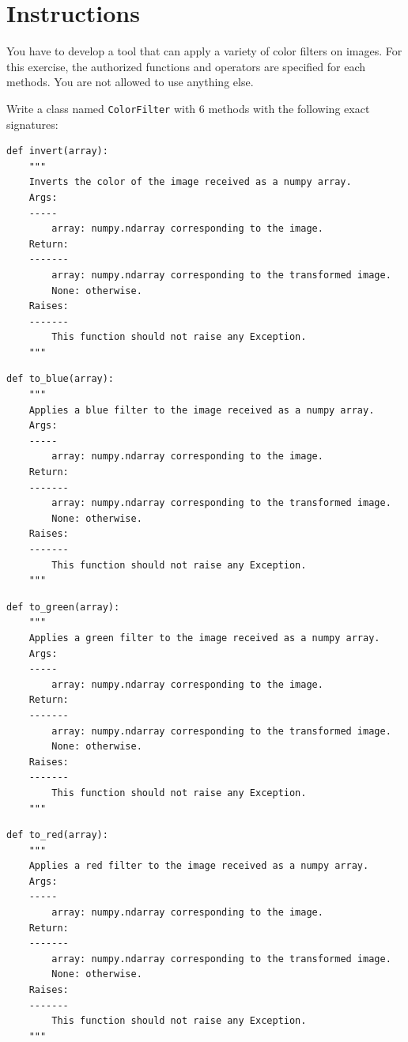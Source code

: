 \documentclass{42-en}
\begin{document}
\section*{Instructions}
You have to develop a tool that can apply a variety of color filters on images.
For this exercise, the authorized functions and operators are specified for each methods.
You are not allowed to use anything else.

Write a class named \texttt{ColorFilter} with 6 methods with the following exact signatures:

\begin{verbatim}
def invert(array):
    """
    Inverts the color of the image received as a numpy array.
    Args:
    -----
        array: numpy.ndarray corresponding to the image.
    Return:
    -------
        array: numpy.ndarray corresponding to the transformed image.
        None: otherwise.
    Raises:
    -------
        This function should not raise any Exception.
    """
\end{verbatim}
\begin{verbatim}
def to_blue(array):
    """
    Applies a blue filter to the image received as a numpy array.
    Args:
    -----
        array: numpy.ndarray corresponding to the image.
    Return:
    -------
        array: numpy.ndarray corresponding to the transformed image.
        None: otherwise.
    Raises:
    -------
        This function should not raise any Exception.
    """
\end{verbatim}
\begin{verbatim}
def to_green(array):
    """
    Applies a green filter to the image received as a numpy array.
    Args:
    -----
        array: numpy.ndarray corresponding to the image.
    Return:
    -------
        array: numpy.ndarray corresponding to the transformed image.
        None: otherwise.
    Raises:
    -------
        This function should not raise any Exception.
    """
\end{verbatim}
\begin{verbatim}
def to_red(array):
    """
    Applies a red filter to the image received as a numpy array.
    Args:
    -----
        array: numpy.ndarray corresponding to the image.
    Return:
    -------
        array: numpy.ndarray corresponding to the transformed image.
        None: otherwise.
    Raises:
    -------
        This function should not raise any Exception.
    """
\end{verbatim}
\end{document}
